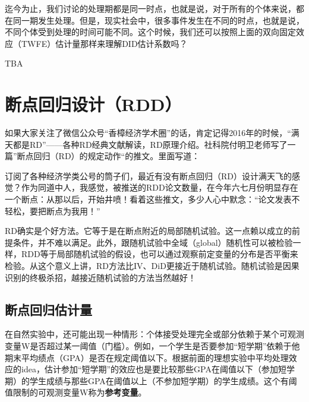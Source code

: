 \documentclass[cn,12pt,math=newtx,citestyle=gb7714-2015,bibstyle=gb7714-2015]{elegantbook}
\begin{document}
	迄今为止，我们讨论的处理期都是同一时点，也就是说，对于所有的个体来说，都在同一期发生处理。但是，现实社会中，很多事件发生在不同的时点，也就是说，不同个体受到处理的时间可能不同。这个时候，我们还可以按照上面的双向固定效应（TWFE）估计量那样来理解DID估计系数吗？
	
	TBA
	
	
	
	\section{断点回归设计（RDD）}
	
	如果大家关注了微信公众号“香樟经济学术圈”的话，肯定记得2016年的时候，“满天都是RD”——各种RD经典文献解读，RD原理介绍。社科院付明卫老师写了一篇”断点回归（RD）的规定动作“的推文。里面写道：
	
	订阅了各种经济学类公号的筒子们，最近有没有断点回归（RD）设计满天飞的感觉？作为同道中人，我感觉，被推送的RDD论文数量，在今年六七月份明显存在一个断点：从那以后，开始井喷！看着这些推文，多少人心中默念：“论文发表不轻松，要把断点为我用！”
	
	RD确实是个好方法。它等于是在断点附近的局部随机试验。这一点赖以成立的前提条件，并不难以满足。此外，跟随机试验中全域（global）随机性可以被检验一样，RDD等于局部随机试验的假设，也可以通过观察前定变量的分布是否平衡来检验。从这个意义上讲，RD方法比IV、DiD更接近于随机试验。随机试验是因果识别的终极杀招，越接近随机试验的方法当然越好！
	
	\subsection{断点回归估计量}
	
	在自然实验中，还可能出现一种情形：个体接受处理完全或部分依赖于某个可观测变量W是否超过某一阈值（门槛）。例如，一个学生是否要参加“短学期”依赖于他期末平均绩点（GPA）是否在规定阈值以下。根据前面的理想实验中平均处理效应的idea，估计参加“短学期”的效应也是要比较那些GPA在阈值以下（参加短学期）的学生成绩与那些GPA在阈值以上（不参加短学期）的学生成绩。这个有阈值限制的可观测变量W称为\textbf{参考变量}。
	
\end{document}
